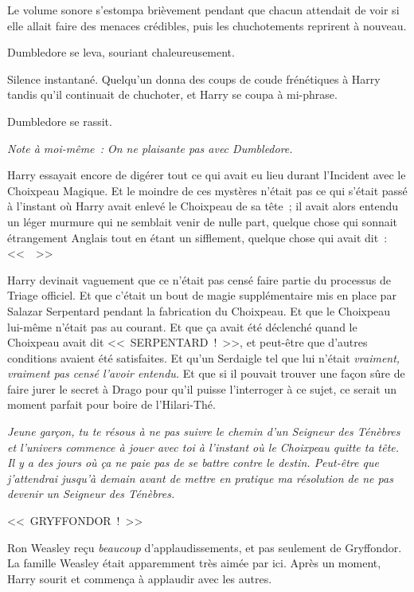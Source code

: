 Le volume sonore s'estompa brièvement pendant que chacun attendait de voir si elle allait faire des menaces crédibles, puis les chuchotements reprirent à nouveau.

Dumbledore se leva, souriant chaleureusement.

Silence instantané. Quelqu'un donna des coups de coude frénétiques à Harry tandis qu'il continuait de chuchoter, et Harry se coupa à mi-phrase.

Dumbledore se rassit.

\emph{Note à moi-même~: On ne plaisante pas avec Dumbledore.}

Harry essayait encore de digérer tout ce qui avait eu lieu durant l'Incident avec le Choixpeau Magique. Et le moindre de ces mystères n'était pas ce qui s'était passé à l'instant où Harry avait enlevé le Choixpeau de sa tête~; il avait alors entendu un léger murmure qui ne semblait venir de nulle part, quelque chose qui sonnait étrangement Anglais tout en étant un sifflement, quelque chose qui avait dit~: <<~~>>

Harry devinait vaguement que ce n'était pas censé faire partie du processus de Triage officiel. Et que c'était un bout de magie supplémentaire mis en place par Salazar Serpentard pendant la fabrication du Choixpeau. Et que le Choixpeau lui-même n'était pas au courant. Et que ça avait été déclenché quand le Choixpeau avait dit <<~SERPENTARD~!~>>, et peut-être que d'autres conditions avaient été satisfaites. Et qu'un Serdaigle tel que lui n'était \emph{vraiment, vraiment pas censé l'avoir entendu.} Et que si il pouvait trouver une façon sûre de faire jurer le secret à Drago pour qu'il puisse l'interroger à ce sujet, ce serait un moment parfait pour boire de l'Hilari-Thé.

\emph{Jeune garçon, tu te résous à ne pas suivre le chemin d'un Seigneur des Ténèbres et l'univers commence à jouer avec toi à l'instant où le Choixpeau quitte ta tête. Il y a des jours où ça ne paie pas de se battre contre le destin. Peut-être que j'attendrai jusqu'à demain avant de mettre en pratique ma résolution de ne pas devenir un Seigneur des Ténèbres.}

<<~GRYFFONDOR~!~>>

Ron Weasley reçu \emph{beaucoup} d'applaudissements, et pas seulement de Gryffondor. La famille Weasley était apparemment très aimée par ici. Après un moment, Harry sourit et commença à applaudir avec les autres.

